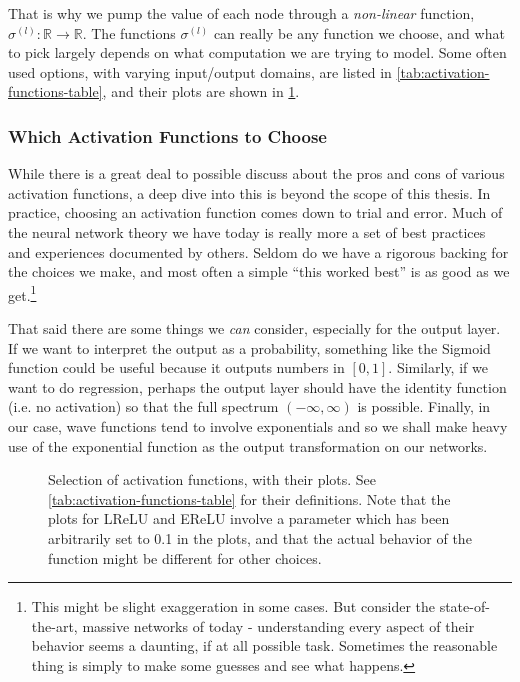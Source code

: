 \documentclass[Thesis.tex]{subfiles}
\begin{document}
That is why we pump the value of each
node through a \emph{non-linear} function, $\sigma^{(l)}: \mathbb{R}\to\mathbb{R}$.
The functions $\sigma^{(l)}$ can really be any function we choose, and what to
pick largely depends on what computation we are trying to model. Some often used
options, with varying input/output domains, are listed in
\cref{tab:activation-functions-table}, and their plots are shown in
\cref{fig:activation-function-gallery}.

\subsubsection{Which Activation Functions to Choose}

While there is a great deal to possible discuss about the pros and cons of various
activation functions, a deep dive into this is beyond the scope of this
thesis. In practice, choosing an activation function comes down to trial
and error. Much of the neural network theory we have today is really more a set
of best practices and experiences documented by others. Seldom do we have a
rigorous backing for the choices we make, and most often a simple ``this worked
best'' is as good as we get.\footnote{This might be slight exaggeration in some
cases. But consider the state-of-the-art, massive networks of today -
understanding every aspect of their behavior seems a daunting, if at all
possible task. Sometimes the reasonable thing is simply to make some guesses and
see what happens.}

That said there are some things we \emph{can} consider, especially for the
output layer. If we want to interpret the output as a probability, something
like the Sigmoid function could be useful because it outputs numbers in $[0,
1]$. Similarly, if we want to do regression, perhaps the output layer should
have the identity function (i.e. no activation) so that the full spectrum
$(-\infty, \infty)$ is possible. Finally, in our case, wave functions tend to
involve exponentials and so we shall make heavy use of the exponential function
as the output transformation on our networks.

\begin{figure}[h]
  \centering
  
  \caption[Gallery of selected activation functions]{Selection of activation functions, with their plots. See
    \cref{tab:activation-functions-table} for their definitions. Note that the
    plots for LReLU and EReLU involve a parameter which has been arbitrarily set
    to 0.1 in the plots, and that the actual behavior of the function might be
    different for other choices.
  }
  \label{fig:activation-function-gallery}
\end{figure}
\end{document}
